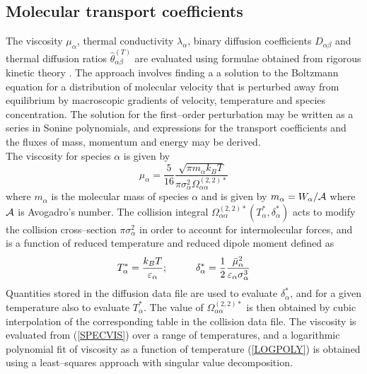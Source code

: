 \documentclass[dvips]{article}
\begin{document}
\subsection{Molecular transport coefficients}
The viscosity $\mu_{\alpha}$, thermal conductivity $\lambda_{\alpha}$,
binary diffusion coefficients $D_{\alpha\beta}$ and thermal diffusion
ratios $\hat{\theta}_{\alpha\beta}^{(T)}$ are evaluated using formulae
obtained from rigorous kinetic theory \cite{ChapmanCowling,HCB}.  The
approach involves finding a
a solution to the Boltzmann equation for a distribution of molecular
velocity that is perturbed away from equilibrium by macroscopic gradients of
velocity, temperature and species concentration.  The solution for the
first--order perturbation may be written as a series in Sonine
polynomials, and expressions for the transport coefficients and the
fluxes of mass, momentum and energy may be derived.\\

\noindent
The viscosity for species $\alpha$ is given by \cite{HCB}
\begin{equation}    
\mu_{\alpha} = \frac{5}{16}\frac{\sqrt{\pi m_{\alpha}k_{B}T}}
{\pi\sigma_{\alpha}^{2}\Omega_{\alpha\alpha}^{(2,2)*}}
\label{SPECVIS}
\end{equation}    
where $m_{\alpha}$ is the molecular mass of species $\alpha$ and is
given by $m_{\alpha} = W_{\alpha}/{\cal A}$ where ${\cal A}$ is
Avogadro's number.  The collision integral
$\Omega_{\alpha\alpha}^{(2,2)*}(T_{\alpha}^{*},\delta_{\alpha}^{*})$
acts to modify the collision
cross--section $\pi\sigma_{\alpha}^{2}$ in order to account for
intermolecular forces, and is a function of reduced temperature and
reduced dipole moment defined as
\begin{equation}   
T_{\alpha}^{*} = \frac{k_{B}T}{\varepsilon_{\alpha}};\hspace{10mm}
\delta_{\alpha}^{*} = \frac{1}{2}\frac{\bar{\mu}_{\alpha}^{2}}
{\varepsilon_{\alpha}\sigma_{\alpha}^{3}}
\end{equation}   
Quantities stored in the diffusion data file are used to evaluate 
$\delta_{\alpha}^{*}$, and for a given temperature also 
to evaluate $T_{\alpha}^{*}$.  The value of $\Omega_{\alpha\alpha}^{(2,2)*}$
is then obtained by cubic interpolation of the corresponding table in the
collision data file.  The viscosity is evaluated from (\ref{SPECVIS})
over a range of temperatures, and a logarithmic polynomial fit of viscosity as
a function of temperature (\ref{LOGPOLY}) is obtained using a
least--squares approach with singular value decomposition.\\
\end{document}
